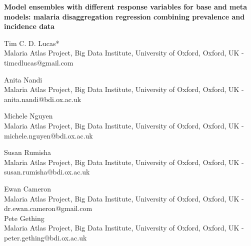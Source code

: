 \documentclass[11pt]{article}
\begin{document}
\templatefigures{}



\small{

\begin{center}
\textbf{Model ensembles with different response variables for base and meta models: malaria disaggregation regression combining prevalence and incidence data}
\end{center}



\begin{center}
{Tim C. D. Lucas*}\\
{Malaria Atlas Project, Big Data Institute, University of Oxford, Oxford, UK - timcdlucas@gmail.com}\\ 
\vspace{0.2cm}

{Anita Nandi}\\
{Malaria Atlas Project, Big Data Institute, University of Oxford, Oxford, UK - anita.nandi@bdi.ox.ac.uk }\\ 

\vspace{0.1cm}

{Michele Nguyen}\\
{Malaria Atlas Project, Big Data Institute, University of Oxford, Oxford, UK - michele.nguyen@bdi.ox.ac.uk }\\ 

\vspace{0.1cm}

{Susan Rumisha}\\
{Malaria Atlas Project, Big Data Institute, University of Oxford, Oxford, UK - susan.rumisha@bdi.ox.ac.uk }\\ 

\vspace{0.1cm}

{Ewan Cameron}\\
{Malaria Atlas Project, Big Data Institute, University of Oxford, Oxford, UK - dr.ewan.cameron@gmail.com }\\ 

\vspace{0.1cm}
{Pete Gething}\\
{Malaria Atlas Project, Big Data Institute, University of Oxford, Oxford, UK - peter.gething@bdi.ox.ac.uk }\\ 


\end{center}}
\end{document}
